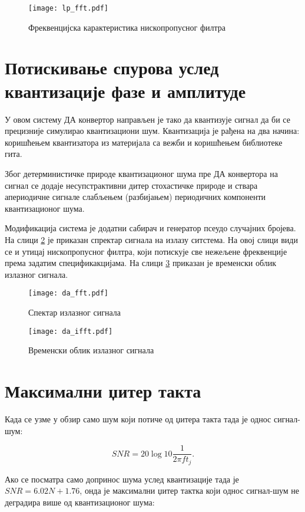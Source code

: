 \documentclass[conference]{IEEEJERM}
\begin{document}
\begin{figure}[t]
  \centering
  \texttt{[image: lp\_fft.pdf]}
  \caption{Фреквенцијска карактеристика нископропусног филтра}
  \label{fig:lp}
\end{figure}

\section{Потискивање спурова услед квантизације фазе и амплитуде}

У овом систему ДА конвертор направљен је тако да квантизује сигнал да би се прецизније симулирао квантизациони шум.
Квантизација је рађена на два начина: коришћењем квантизатора из материјала са вежби и коришћењем библиотеке гита.

Због детерминистичке природе квантизационог шума пре ДА конвертора на сигнал се додаје несупстрактивни дитер стохастичке природе и ствара апериодичне сигнале слабљењем (разбијањем) периодичних компоненти квантизационог шума.

Модификација система је додатни сабирач и генератор псеудо случајних бројева. На слици \ref{fig:da_fft} је приказан спректар сигнала на излазу ситстема.
На овој слици види се и утицај нископропусног филтра, који потискује све нежељене фреквенције према задатим спецификакцијама. 
На слици \ref{fig:da_ifft} приказан је временски облик излазног сигнала.

\begin{figure}[t]
	\centering
	\texttt{[image: da\_fft.pdf]}
	\caption{Спектар излазног сигнала}
	\label{fig:da_fft}
\end{figure}

\begin{figure}[t]
	\centering
	\texttt{[image: da\_ifft.pdf]}
	\caption{Временски облик излазног сигнала}
	\label{fig:da_ifft}
\end{figure}


\section{Максимални џитер такта}

Када се узме у обзир само шум који потиче од џитера такта тада је однос сигнал-шум:

\begin{equation}
SNR=20\log10\frac{1}{2\pi f t_j}.
\end{equation}


Ако се посматра само допринос шума услед квантизације тада је $SNR = 6.02N + 1.76$, онда је максимални џитер тактка који однос сигнал-шум не деградира више од квантизационог шума:
\end{document}
